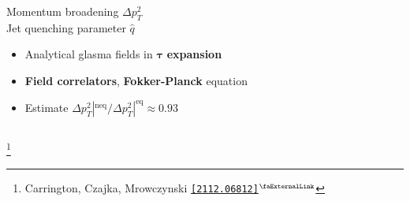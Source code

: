 \documentclass[aspectratio=169,11pt,usenames,dvipsnames]{beamer}
\renewcommand{\thefootnote}{\color{customblue}\faPaperPlaneO}
\newcommand\blfootnote[1]{%
  \begingroup
  \renewcommand\thefootnote{}\footnote{#1}%
  \addtocounter{footnote}{-1}%
  \endgroup
}
\begin{document}
\begin{frame}[t,noframenumbering]
\begin{columns}[onlytextwidth,t]
\begin{center}
            {\Large\color{palteal} Momentum broadening $\Delta p_T^2$ \\[5pt] Jet quenching parameter $\hat{q}$  \\[10pt]}
            \footnotesize
                \begin{itemize}
                    \item {\color{lightgray}Analytical glasma fields in $\boldsymbol{\tau}$ \textbf{expansion}}
                    \item {\color{lightgray} {\bfseries Field correlators}, {\bfseries Fokker-Planck} equation}
                    \item {\color{lightgray} Estimate $\Delta p_T^2|^\mathrm{neq}/\Delta p_T^2|^\mathrm{eq}\approx 0.93$}
                \end{itemize}
        \end{center}
    \end{columns}
    \blfootnote{\scriptsize Carrington, Czajka, Mrowczynski \href{https://arxiv.org/abs/2112.06812}{\color{palgold}\texttt{[2112.06812]}$^\text{\scalebox{0.9}{\faExternalLink}}$}}
\end{frame}


\end{document}
